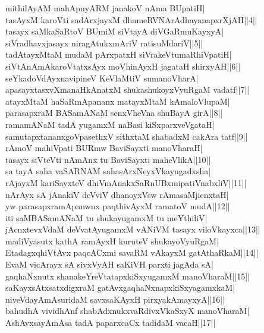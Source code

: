 \documentclass{article}
\begin{document}
mithilAyAM mahApuyARM janakoV nAma BUpatiH|\\
tasAyxM karoVti sadArxjayxM dhameRVNArAdhayanapxrXjAH||4||\\
tasayx saMkaSaRtoV BUmiM siVtayA diVGaRmuKayxyA|\\
siVradhavxjasayx niragAtukxmAriV ratisuMdariV||5||\\
tadAtayxMtaM mudaM pArxpatxH siVrakeVtumaRhiVpatiH|\\
siVtAnAmAkaroVtatxsAyx moVhinAyxH jagataH shirxyAH||6||\\
seYkadoVdAyxnavipineV KeVlaMtiV sumanoVharA|\\
apasayxtasxvXmanaHkAnatxM shukashukoyxVyuRgaM vadatf||7||\\
atayxMtaM haSaRmApananx matayxMtaM kAmaloVlupaM|\\
parasapxraM BASamANaM senxVheVna shuBayA girA||8||\\
ramamANaM tadA yugamxM naBasi kiSxparxveVgataH|\\
samutapxtananxgoVpasethxV sithxtaM shabadxM cakAra tatf||9||\\
rAmoV mahiVpati BURmw BaviSayxti manoVharaH|\\
tasayx siVteVti nAmAnx tu BaviSayxti maheVlikA||10||\\
sa tayA saha vaSARNAM sahasArxNeyxVkayugadxsha|\\
rAjayxM kariSayxteV dhiVmAnakxSaRnUBxmipatiVnabxliV||11||\\
nArAyx sA jAnakiV deVviV dhanoyxVsw rAmasaMjicnxtaH|\\
yw parasapxramApanwnx paqthivAyxM ramatoV mudA||12||\\
iti saMBASamANaM tu shukayugamxM tu meYthiliV|\\
jAcnxtevxVdaM deVvatAyugamxM vANiVM tasayx viloVkayxca||13||\\
madiVyasutx kathA ramAyxH kuruteV shukayoVyuRgaM|\\
EtadagxqhiVtAvx paqcACxmi savaRM vAkayxM gatAthaRkaM||14||\\
EvaM vicArayx sA sivxVyAH saKiVH parxti jagAda sA|\\
gaqhaNxnutx shanakeYreVtatapxkiSxyugamxM manoVharaM||15||\\
saKayxsAtxsatxdigxraM gatAvxgaqhaNxnapxkiSxyagamxkaM|\\
niveVdayAmAsuridaM savxsaKAyxH pirxyakAmayxyA||16||\\
bahudhA vividhAnf shabAdxnukxvaRdivxVkaSxyX manoVharaM|\\
AshAvxsayAmAsa tadA paparxcaCx tadidaM vacaH||17||\\
\end{document}
